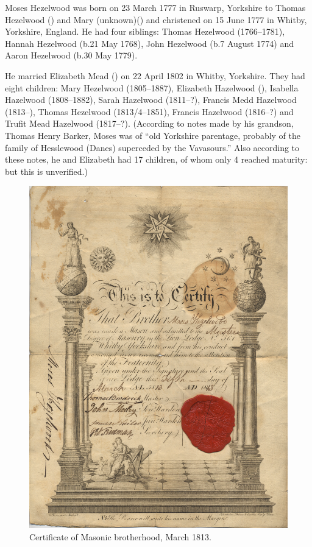 
Moses Hezelwood was born on 23 March 1777 in 	Ruswarp, Yorkshire to Thomas Hezelwood () and Mary (unknown)() and christened on 15 June 1777 in	Whitby, Yorkshire, England.\cite{MHezelwoodBirth} He had four siblings: Thomas Hezelwood (1766--1781), Hannah Hezelwood (b.21 May 1768), John Hezelwood (b.7 August 1774) and Aaron Hezelwood (b.30 May 1779).

He married Elizabeth Mead () on 22 April 1802 in	Whitby, Yorkshire.\cite{MHezelwoodMarriage}  They had eight children: Mary Hezelwood (1805--1887), Elizabeth Hazelwood (), Isabella Hazelwood (1808--1882), Sarah Hazelwood (1811--?), Francis Medd Hazelwood (1813--), Thomas Hezelwood (1813/4--1851), Francis Hazelwood (1816--?) and Trufit Mead Hazelwood (1817--?). (According to notes made by his grandson, Thomas Henry Barker, Moses  was of ``old Yorkshire parentage, probably of the family of Hesslewood (Danes) superceded by the Vavasours.'' Also according to these notes, he and Elizabeth had 17 children, of whom only 4 reached maturity: but this is unverified.)

\begin{figure}
 \centering
 \includegraphics{sources/MosesHezelwoord_MasonicCert_1813.png}
 \caption{Certificate of Masonic brotherhood, March 1813.}
\end{figure}

